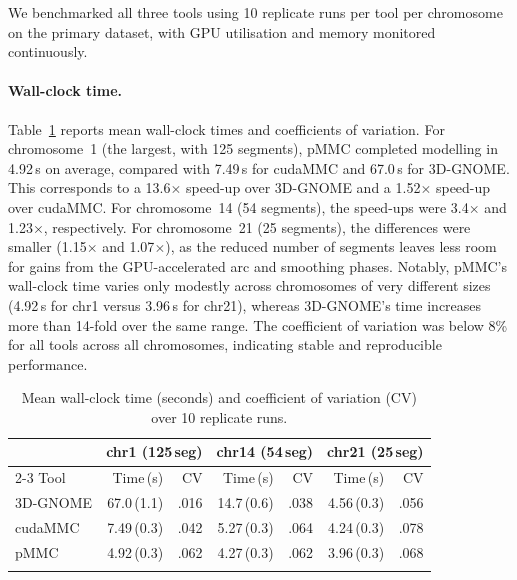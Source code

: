 \documentclass[webpdf,traditional,large]{oup-authoring-template}%
\begin{document}
We benchmarked all three tools using 10 replicate runs per tool per chromosome on the primary dataset, with GPU utilisation and memory monitored continuously.

\paragraph{Wall-clock time.}
Table~\ref{tab:walltime} reports mean wall-clock times and coefficients of variation. For chromosome~1 (the largest, with 125 segments), pMMC completed modelling in 4.92\,s on average, compared with 7.49\,s for cudaMMC and 67.0\,s for 3D-GNOME. This corresponds to a 13.6$\times$ speed-up over 3D-GNOME and a 1.52$\times$ speed-up over cudaMMC. For chromosome~14 (54 segments), the speed-ups were 3.4$\times$ and 1.23$\times$, respectively. For chromosome~21 (25 segments), the differences were smaller (1.15$\times$ and 1.07$\times$), as the reduced number of segments leaves less room for gains from the GPU-accelerated arc and smoothing phases. Notably, pMMC's wall-clock time varies only modestly across chromosomes of very different sizes (4.92\,s for chr1 versus 3.96\,s for chr21), whereas 3D-GNOME's time increases more than 14-fold over the same range. The coefficient of variation was below 8\% for all tools across all chromosomes, indicating stable and reproducible performance.

\begin{table}[!t]
\begin{center}
\begin{minipage}{\columnwidth}
\caption{Mean wall-clock time (seconds) and coefficient of variation (CV) over 10 replicate runs.\label{tab:walltime}}%
\tabcolsep=3pt
\begin{tabular*}{\columnwidth}{@{\extracolsep\fill}lrrrrrr@{\extracolsep\fill}}
\toprule
 & \multicolumn{2}{c}{chr1 (125\,seg)} & \multicolumn{2}{c}{chr14 (54\,seg)} & \multicolumn{2}{c}{chr21 (25\,seg)} \\
\cline{2-3}\cline{4-5}\cline{6-7}
Tool & Time\,(s) & CV & Time\,(s) & CV & Time\,(s) & CV \\
\midrule
3D-GNOME  & 67.0\,(1.1) & .016 & 14.7\,(0.6) & .038 & 4.56\,(0.3) & .056 \\
cudaMMC   &  7.49\,(0.3) & .042 &  5.27\,(0.3) & .064 & 4.24\,(0.3) & .078 \\
pMMC      &  4.92\,(0.3) & .062 &  4.27\,(0.3) & .062 & 3.96\,(0.3) & .068 \\
\botrule
\end{tabular*}
\end{minipage}
\end{center}
\end{table}
\end{document}

